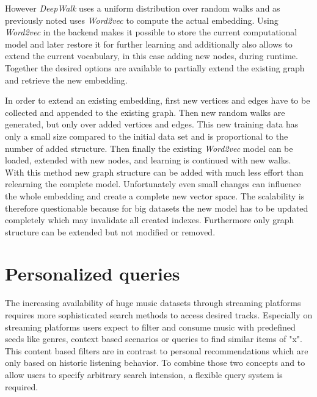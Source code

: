 \documentclass[sigconf]{acmart}
\begin{document}
However \emph{DeepWalk} uses a uniform distribution over random walks and as previously noted uses \emph{Word2vec} to compute the actual embedding. Using  \emph{Word2vec} in the backend makes it possible to store the current computational model and later restore it for further learning and additionally also allows to extend the current vocabulary, in this case adding new nodes, during runtime. Together the desired options are available to partially extend the existing graph and retrieve the new embedding.

In order to extend an existing embedding, first new vertices and edges have to be collected and appended to the existing graph. Then new random walks are generated, but only over added vertices and edges. This new training data has only a small size compared to the initial data set and is proportional to the number of added structure. Then finally the existing \emph{Word2vec} model can be loaded, extended with new nodes, and learning is continued with new walks. \\


With this method new graph structure can be added with much less effort than relearning the complete model. Unfortunately even small changes can influence the whole embedding and create a complete new vector space. The scalability is therefore questionable because for big datasets the new model has to be updated completely which may invalidate all created indexes. Furthermore only graph structure can be extended but not modified or removed.


\section{Personalized queries}
The increasing availability of huge music datasets through streaming platforms requires more sophisticated search methods to access desired tracks. Especially on streaming platforms users expect to filter and consume music with predefined seeds like genres, context based scenarios or queries to find similar items of "x". This content based filters are in contrast to personal recommendations which are only based on historic listening behavior. To combine those two concepts and to allow users to specify arbitrary search intension, a flexible query system is required.
\end{document}
